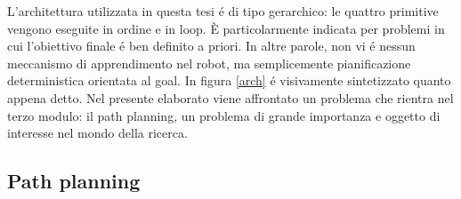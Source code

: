 \documentclass[14pt,a4paper]{extarticle}
\begin{document}
L'architettura utilizzata in questa tesi é di tipo gerarchico: le quattro primitive vengono eseguite in ordine e in loop. È particolarmente indicata per problemi in cui l'obiettivo finale é ben definito a priori. In altre parole, non vi é nessun meccanismo di apprendimento nel robot, ma semplicemente pianificazione deterministica orientata al goal. In figura \ref{arch} é visivamente sintetizzato quanto appena detto. Nel presente elaborato viene affrontato un problema che rientra nel terzo modulo: il path planning, un problema di grande importanza e oggetto di interesse nel mondo della ricerca.

\subsection{Path planning}
\end{document}
